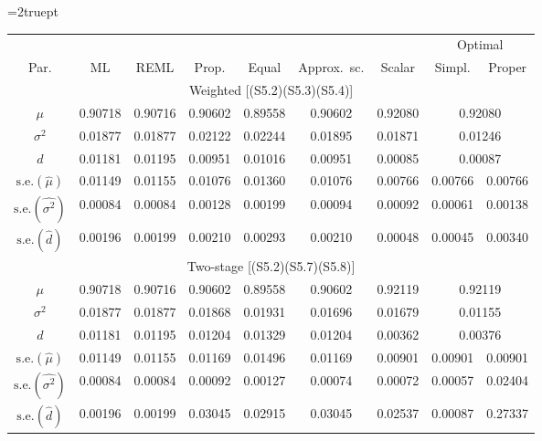 \documentclass[11pt,a5paper,twoside]{book}
\begin{document}
\begin{table}[t!]
\begin{center}
\vspace*{2mm}
\def\arraystretch{0.6}\small\tabcolsep=2truept \begin{tabular}{ccccccccc}
\hline\hline
     &   &     &      &             &         &      & \multicolumn{2}{c}{Optimal}\\
\cline{8-9}
 Par.& ML& REML& Prop.& Equal       & Approx.~sc.&Scalar& Simpl. & Proper\\
\hline
\hline
\multicolumn{9}{c}{{Weighted [(S5.2)(S5.3)(S5.4)]}}\\
\hline
$\mu$ & 0.90718 & 0.90716 & 0.90602 & 0.89558 & 0.90602 & 0.92080 & \multicolumn{2}{c}{0.92080}   \\
$\sigma^2$ & 0.01877 & 0.01877 & 0.02122 & 0.02244 & 0.01895 & 0.01871 & \multicolumn{2}{c}{0.01246}  \\
$d$ & 0.01181 & 0.01195 & 0.00951 & 0.01016 & 0.00951 & 0.00085 & \multicolumn{2}{c}{0.00087}  \\
\hline
$\mbox{s.e.}(\widehat{\mu})$ & 0.01149 & 0.01155 & 0.01076 & 0.01360 & 0.01076 & 0.00766 & 0.00766 & 0.00766 \\
$\mbox{s.e.}(\widehat{\sigma^2})$ & 0.00084 & 0.00084 & 0.00128 & 0.00199 & 0.00094 & 0.00092 & 0.00061 & 0.00138 \\
  $\mbox{s.e.}(\widehat{d})$ & 0.00196 & 0.00199 & 0.00210 & 0.00293 & 0.00210 & 0.00048 & 0.00045 & 0.00340 \\
\hline\hline
\multicolumn{9}{c}{{Two-stage [(S5.2)(S5.7)(S5.8)]}}\\
\hline
$\mu$ & 0.90718 & 0.90716 & 0.90602 & 0.89558 & 0.90602 & 0.92119 & \multicolumn{2}{c}{0.92119}  \\
$\sigma^2$ & 0.01877 & 0.01877 & 0.01868 & 0.01931 & 0.01696 & 0.01679 & \multicolumn{2}{c}{0.01155}  \\
$d$ & 0.01181 & 0.01195 & 0.01204 & 0.01329 & 0.01204 & 0.00362 & \multicolumn{2}{c}{0.00376}  \\

\hline
$\mbox{s.e.}(\widehat{\mu})$ & 0.01149 & 0.01155 & 0.01169 & 0.01496 & 0.01169 & 0.00901 & 0.00901 & 0.00901 \\
$\mbox{s.e.}(\widehat{\sigma^2})$ & 0.00084 & 0.00084 & 0.00092 & 0.00127 & 0.00074 & 0.00072 & 0.00057 & 0.02404 \\
  $\mbox{s.e.}(\widehat{d})$& 0.00196 & 0.00199 & 0.03045 & 0.02915 & 0.03045 & 0.02537 & 0.00087 & 0.27337 \\


\end{tabular}
\end{center}
\end{table}
\end{document}
